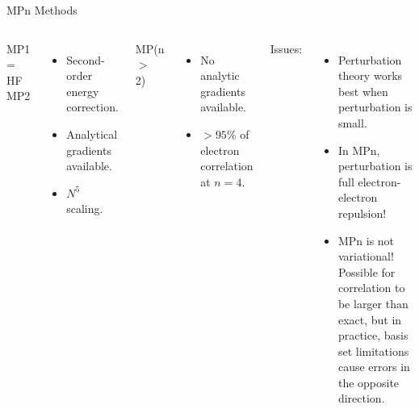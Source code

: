 \documentclass[aspectratio=169]{beamer}
\begin{document}
    \begin{frame}{MPn Methods}

        \begin{columns}
            MP1 = HF\newline
            \newline
            MP2
            \begin{itemize}
                \item Second-order energy correction.
                \item Analytical gradients available.
                \item $N^5$ scaling.
            \end{itemize}

            MP(n $>$ 2)
            \begin{itemize}
                \item No analytic gradients available.
                \item $> 95\%$ of electron correlation at $n=4$.
            \end{itemize}

            Issues:
            \begin{itemize}
                \item Perturbation theory works best when perturbation is small.
                \item In MPn, perturbation is full electron-electron repulsion!
                \item MPn is not variational! Possible for correlation to be larger than exact, but in practice, basis set limitations cause errors in the opposite direction.
            \end{itemize}

        \end{columns}

    \end{frame}
\end{document}
